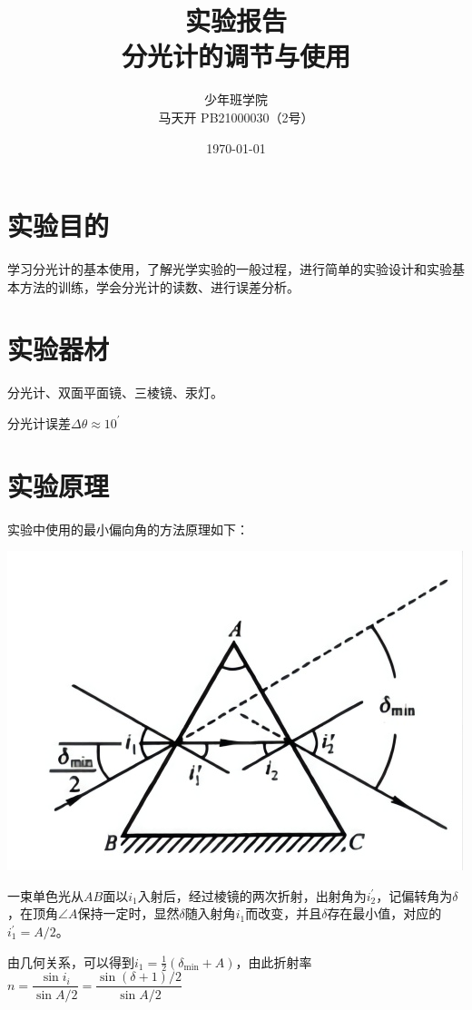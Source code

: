 \documentclass[a4paper]{ltxdoc}
\title{实验报告\\分光计的调节与使用}
\author{少年班学院\\马天开 PB21000030（2号）}
\date{\today}
\newenvironment{Figure}
{\par\medskip\noindent\minipage{\linewidth}}
{\endminipage\par\medskip}
\begin{document}
\begin{multicols}{2}
    \maketitle
    \section{实验目的}
    学习分光计的基本使用，了解光学实验的一般过程，进行简单的实验设计和实验基本方法的训练，学会分光计的读数、进行误差分析。
    \section{实验器材}
    分光计、双面平面镜、三棱镜、汞灯。

    分光计误差$\Delta \theta \approx 10^\prime$

    \section{实验原理}

    实验中使用的最小偏向角的方法原理如下：
    \begin{Figure}
        \centering
        \includegraphics[width=\linewidth]{img/1.png}
    \end{Figure}

    一束单色光从$AB$面以$i _1$入射后，经过棱镜的两次折射，出射角为$i ^{\prime} _2$，记偏转角为$\delta$，在顶角$\angle A$保持一定时，显然$\delta$随入射角$i _1$而改变，并且$\delta$存在最小值，对应的$i_1^{\prime} = A/2$。

    由几何关系，可以得到$i_1 = \frac 1 2 (\delta_{\min} + A)$，由此折射率$n = \dfrac{\sin i_i}{\sin A/2} = \dfrac{\sin (\delta + 1)/2}{\sin A/2}$


\end{multicols}
\end{document}

